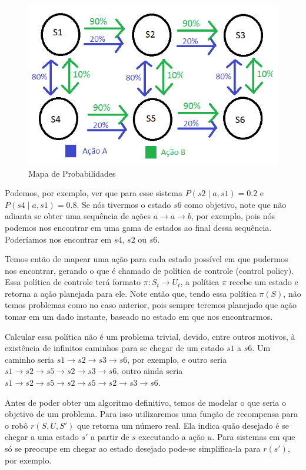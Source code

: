 \begin{figure}[h]
    \centering
    \includegraphics[width=120mm]{images/probabilidade-markov}
    \caption{\label{img:MapaDeProbabilidadesMarkov}Mapa de Probabilidades}
\end{figure}

Podemos, por exemplo, ver que para esse sistema $ P \left( s2 \mid a, s1 \right) = 0.2 $ e $ P \left( s4 \mid a, s1 \right) = 0.8 $. Se nós tivermos o estado $ s6 $ como objetivo, note que não adianta se obter uma sequência de ações $ a \rightarrow a \rightarrow b$, por exemplo, pois nós podemos nos encontrar em uma gama de estados ao final dessa sequência. Poderíamos nos encontrar em $ s4 $, $ s2 $ ou $ s6 $.

Temos então de mapear uma ação para cada estado possível em que pudermos nos encontrar, gerando o que é chamado de política de controle (control policy). Essa política de controle terá formato $ \pi: S_t \rightarrow U_t $, a política $ \pi $ recebe um estado e retorna a ação planejada para ele. Note então que, tendo essa política $ \pi \left( S \right) $, não temos problemas como no caso anterior, pois sempre teremos planejado que ação tomar em um dado instante, baseado no estado em que nos encontrarmos.

Calcular essa política não é um problema trivial, devido, entre outros motivos, à existência de infinitos caminhos para se chegar de um estado $ s1 $ a $ s6 $. Um caminho seria $ s1 \rightarrow s2 \rightarrow s3 \rightarrow s6 $, por exemplo, e outro seria $ s1 \rightarrow s2 \rightarrow s5 \rightarrow s2 \rightarrow s3 \rightarrow s6 $, outro ainda seria $ s1 \rightarrow s2 \rightarrow s5 \rightarrow s2 \rightarrow s5 \rightarrow s2 \rightarrow s3 \rightarrow s6 $.

Antes de poder obter um algoritmo definitivo, temos de modelar o que seria o objetivo de um problema. Para isso utilizaremos uma função de recompensa para o robô $ r \left( S, U, S' \right) $ que retorna um número real. Ela indica quão desejado é se chegar a uma estado $ s' $ a partir de $ s $ executando a ação $ u $. Para sistemas em que só se preocupe em chegar ao estado desejado pode-se simplifica-la para $ r \left( s' \right) $, por exemplo.


